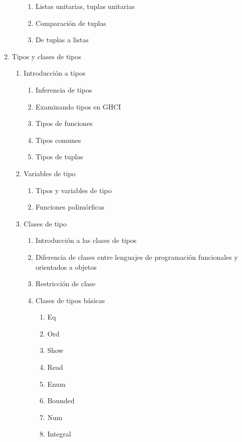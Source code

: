 \documentclass[11pt, letter-paper]{article}
\begin{document}
\begin{enumerate}
\begin{enumerate}
\begin{enumerate}
            \item Listas unitarias, tuplas unitarias
            \item Comparación de tuplas
            \item De tuplas a listas
        \end{enumerate}
    \end{enumerate}
    \item Tipos y clases de tipos
    \begin{enumerate}
        \item Introducción a tipos
        \begin{enumerate}
            \item Inferencia de tipos
            \item Examinando tipos en GHCI
            \item Tipos de funciones
            \item Tipos comunes
            \item Tipos de tuplas
        \end{enumerate}
        \item Variables de tipo
        \begin{enumerate}
            \item Tipos y variables de tipo
            \item Funciones polimórficas
        \end{enumerate}
        \item Clases de tipo
        \begin{enumerate}
            \item Introducción a las clases de tipos
            \item Diferencia de clases entre lenguajes de programación funcionales y orientados a objetos
            \item Restricción de clase
            \item Clases de tipos básicas
            \begin{enumerate}
                \item Eq
                \item Ord
                \item Show
                \item Read
                \item Enum
                \item Bounded
                \item Num
                \item Integral

\end{enumerate}
\end{enumerate}
\end{enumerate}
\end{enumerate}
\end{document}
